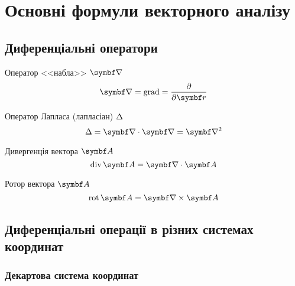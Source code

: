 
\section{Основні формули векторного аналізу}\label{Vanaliz}


\subsection{Диференціальні оператори}

Оператор <<набла>> $\vect{\nabla}$
\begin{equation}\label{nabla}
	\vect{\nabla} = \mathrm{grad} = \frac{\partial}{\partial \vect{r}}
\end{equation}

Оператор Лапласа (лапласіан) $\Delta$
\begin{equation}\label{laplasian}
	\Laplasian = \divg\vect{\nabla} = \vect{\nabla}^2
\end{equation}

Дивергенція вектора $\vect{A}$
\begin{equation}\label{div}
	\mathrm{div}\,\vect{A} = \divg\vect{A}
\end{equation}

Ротор вектора $\vect{A}$
\begin{equation}\label{rot}
	\mathrm{rot}\,\vect{A} = \rot\vect{A}
\end{equation}

\subsection{Диференціальні операції в різних системах координат}


\subsubsection{Декартова система координат}

